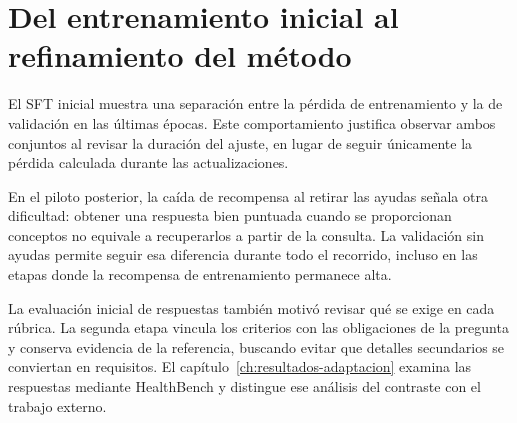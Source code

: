 \section{Del entrenamiento inicial al refinamiento del método}
\label{sec:observaciones-entrenamiento}
El SFT inicial muestra una separación entre la pérdida de entrenamiento y la de validación en las últimas épocas. Este comportamiento justifica observar ambos conjuntos al revisar la duración del ajuste, en lugar de seguir únicamente la pérdida calculada durante las actualizaciones.

En el piloto posterior, la caída de recompensa al retirar las ayudas señala otra dificultad: obtener una respuesta bien puntuada cuando se proporcionan conceptos no equivale a recuperarlos a partir de la consulta. La validación sin ayudas permite seguir esa diferencia durante todo el recorrido, incluso en las etapas donde la recompensa de entrenamiento permanece alta.

La evaluación inicial de respuestas también motivó revisar qué se exige en cada rúbrica. La segunda etapa vincula los criterios con las obligaciones de la pregunta y conserva evidencia de la referencia, buscando evitar que detalles secundarios se conviertan en requisitos. El capítulo~\ref{ch:resultados-adaptacion} examina las respuestas mediante HealthBench y distingue ese análisis del contraste con el trabajo externo.

